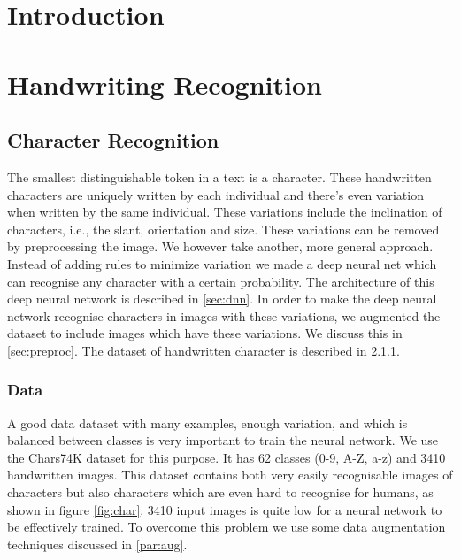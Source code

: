 \documentclass{article}
\begin{document}
 

\begin{abstract} 
  
\end{abstract} 

\section{Introduction}

\section{Handwriting Recognition}

\subsection{Character Recognition}
The smallest distinguishable token in a text is a character. These handwritten characters are uniquely 
written by each individual and there's even variation when written by the same individual. These variations include the inclination of characters, i.e., the slant, orientation and size. These variations can be removed by preprocessing the image. We however take another, more general approach. Instead of adding rules to minimize variation we made a deep neural net which can recognise any character with a certain probability. The architecture of this deep neural network is described in \ref{sec:dnn}. In order to make the deep neural network recognise characters in images with these variations, we augmented the dataset to include images which have these variations. We discuss this in \ref{sec:preproc}. The dataset of handwritten character is described in \ref{sec:data}.

\subsubsection{Data}
\label{sec:data}
A good data dataset with many examples, enough variation, and which is balanced between classes is very important to train the neural network. We use the Chars74K dataset for this purpose. It has 62 classes (0-9, A-Z, a-z) and 3410 handwritten images. This dataset contains both very easily recognisable images of characters but also characters which are even hard to recognise for humans, as shown in figure \ref{fig:char}. 3410 input images is quite low for a neural network to be effectively trained. To overcome this problem we use some data augmentation techniques discussed in \ref{par:aug}. 
\end{document}
